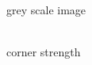 \documentclass[12pt,a4paper,oneside,openright]{book}
\begin{document}
\begin{CJK}{UTF8}{}
\begin{figure}[htbp]
\begin{center}
\begin{minipage}[t]{.32\textwidth}
\begin{center}
        \\
        grey scale image
      \end{center}
    \end{minipage}
    \begin{minipage}[t]{.32\textwidth}
      \begin{center}
        \\
        corner strength
      \end{center}
    \end{minipage}\medskip\\
    \begin{minipage}[t]{.32\textwidth}

\end{minipage}
\end{center}
\end{figure}
\end{CJK}
\end{document}
